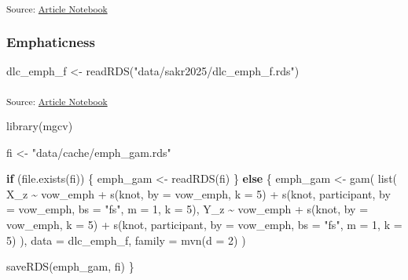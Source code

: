 \documentclass[
]{interact}
\newenvironment{Shaded}{\begin{snugshade}}{\end{snugshade}}
\newcommand{\AttributeTok}[1]{\textcolor[rgb]{0.40,0.45,0.13}{#1}}
\newcommand{\ControlFlowTok}[1]{\textcolor[rgb]{0.00,0.23,0.31}{\textbf{#1}}}
\newcommand{\DecValTok}[1]{\textcolor[rgb]{0.68,0.00,0.00}{#1}}
\newcommand{\FunctionTok}[1]{\textcolor[rgb]{0.28,0.35,0.67}{#1}}
\newcommand{\NormalTok}[1]{\textcolor[rgb]{0.00,0.23,0.31}{#1}}
\newcommand{\OtherTok}[1]{\textcolor[rgb]{0.00,0.23,0.31}{#1}}
\newcommand{\SpecialCharTok}[1]{\textcolor[rgb]{0.37,0.37,0.37}{#1}}
\newcommand{\StringTok}[1]{\textcolor[rgb]{0.13,0.47,0.30}{#1}}
\begin{document}
\textsubscript{Source:
\href{https://stefanocoretta.github.io/mv_uti/index.qmd.html}{Article
Notebook}}

\subsubsection{Emphaticness}\label{emphaticness}

\begin{Shaded}
\begin{Highlighting}[]
\NormalTok{dlc\_emph\_f }\OtherTok{\textless{}{-}} \FunctionTok{readRDS}\NormalTok{(}\StringTok{"data/sakr2025/dlc\_emph\_f.rds"}\NormalTok{)}
\end{Highlighting}
\end{Shaded}

\textsubscript{Source:
\href{https://stefanocoretta.github.io/mv_uti/index.qmd.html}{Article
Notebook}}

\begin{Shaded}
\begin{Highlighting}[]
\FunctionTok{library}\NormalTok{(mgcv)}

\NormalTok{fi }\OtherTok{\textless{}{-}} \StringTok{"data/cache/emph\_gam.rds"}

\ControlFlowTok{if}\NormalTok{ (}\FunctionTok{file.exists}\NormalTok{(fi)) \{}
\NormalTok{  emph\_gam }\OtherTok{\textless{}{-}} \FunctionTok{readRDS}\NormalTok{(fi)}
\NormalTok{\} }\ControlFlowTok{else}\NormalTok{ \{}
\NormalTok{  emph\_gam }\OtherTok{\textless{}{-}} \FunctionTok{gam}\NormalTok{(}
    \FunctionTok{list}\NormalTok{(}
\NormalTok{      X\_z }\SpecialCharTok{\textasciitilde{}}\NormalTok{ vow\_emph }\SpecialCharTok{+}
        \FunctionTok{s}\NormalTok{(knot, }\AttributeTok{by =}\NormalTok{ vow\_emph, }\AttributeTok{k =} \DecValTok{5}\NormalTok{) }\SpecialCharTok{+}
        \FunctionTok{s}\NormalTok{(knot, participant, }\AttributeTok{by =}\NormalTok{ vow\_emph, }\AttributeTok{bs =} \StringTok{"fs"}\NormalTok{, }\AttributeTok{m =} \DecValTok{1}\NormalTok{, }\AttributeTok{k =} \DecValTok{5}\NormalTok{),}
\NormalTok{      Y\_z }\SpecialCharTok{\textasciitilde{}}\NormalTok{ vow\_emph }\SpecialCharTok{+}
        \FunctionTok{s}\NormalTok{(knot, }\AttributeTok{by =}\NormalTok{ vow\_emph, }\AttributeTok{k =} \DecValTok{5}\NormalTok{) }\SpecialCharTok{+}
        \FunctionTok{s}\NormalTok{(knot, participant, }\AttributeTok{by =}\NormalTok{ vow\_emph, }\AttributeTok{bs =} \StringTok{"fs"}\NormalTok{, }\AttributeTok{m =} \DecValTok{1}\NormalTok{, }\AttributeTok{k =} \DecValTok{5}\NormalTok{)}
\NormalTok{    ),}
    \AttributeTok{data =}\NormalTok{ dlc\_emph\_f,}
    \AttributeTok{family =} \FunctionTok{mvn}\NormalTok{(}\AttributeTok{d =} \DecValTok{2}\NormalTok{)}
\NormalTok{  )}
  
  \FunctionTok{saveRDS}\NormalTok{(emph\_gam, fi)}
\NormalTok{\}}
\end{Highlighting}
\end{Shaded}
\end{document}
